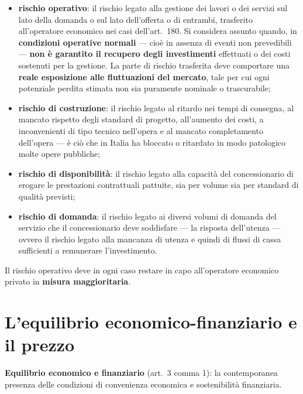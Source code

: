 
\begin{itemize}
  \item \textbf{rischio operativo}: il rischio legato alla gestione dei lavori o dei servizi sul
    lato della domanda o sul lato dell'offerta o di entrambi, trasferito all'operatore economico
    nei casi dell'art.\ 180. Si considera assunto quando, in \textbf{condizioni operative normali}
    --- cioè in assenza di eventi non prevedibili --- \textbf{non è garantito il recupero degli
    investimenti} effettuati o dei costi sostenuti per la gestione. La parte di rischio trasferita
    deve comportare una \textbf{reale esposizione alle fluttuazioni del mercato}, tale per cui ogni
    potenziale perdita stimata non sia puramente nominale o trascurabile;
  \item \textbf{rischio di costruzione}: il rischio legato al ritardo nei tempi di consegna, al
    mancato rispetto degli standard di progetto, all'aumento dei costi, a inconvenienti di tipo
    tecnico nell'opera e al mancato completamento dell'opera --- è ciò che in Italia ha bloccato o
    ritardato in modo patologico molte opere pubbliche;
  \item \textbf{rischio di disponibilità}: il rischio legato alla capacità del concessionario di
    erogare le prestazioni contrattuali pattuite, sia per volume sia per standard di qualità
    previsti;
  \item \textbf{rischio di domanda}: il rischio legato ai diversi volumi di domanda del servizio
    che il concessionario deve soddisfare --- la risposta dell'utenza --- ovvero il rischio legato
    alla mancanza di utenza e quindi di flussi di cassa sufficienti a remunerare l'investimento.
\end{itemize}

Il rischio operativo deve in ogni caso restare in capo all'operatore economico privato in
\textbf{misura maggioritaria}.


\section{L'equilibrio economico-finanziario e il prezzo}

\textbf{Equilibrio economico e finanziario} (art.\ 3 comma 1): la contemporanea presenza delle
condizioni di convenienza economica e sostenibilità finanziaria.

